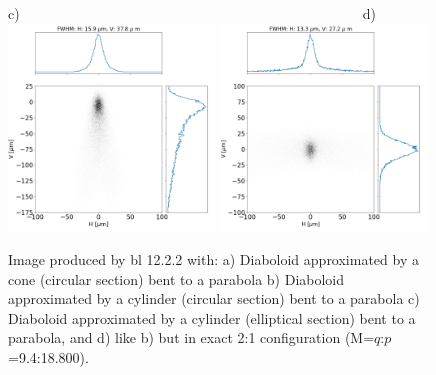 \documentclass{iucr}              %
\newcommand{\inred}[1]{{\color{red}#1}}
\begin{document}
\begin{figure}
\flushleft
c)~~~~~~~~~~~~~~~~~~~~~~~~~~~~~~~~~~~~~~~~~~~~~~~~~d)\\
\centering
\includegraphics[width=0.49\textwidth]{figures/prefinal_approx2.png} 
\includegraphics[width=0.49\textwidth]{figures/prefinal_approx1_exact1over2.png} 


\caption{ Image produced by bl 12.2.2 with: 
a) Diaboloid approximated by a cone (circular section) bent to a parabola b) Diaboloid approximated by a cylinder (circular section) bent to a parabola c) Diaboloid approximated by a cylinder (elliptical section) bent to a parabola, and d) like b) but in exact 2:1 configuration (M=$q$:$p$=9.4:18.800).
}
\end{figure}


\end{document}
